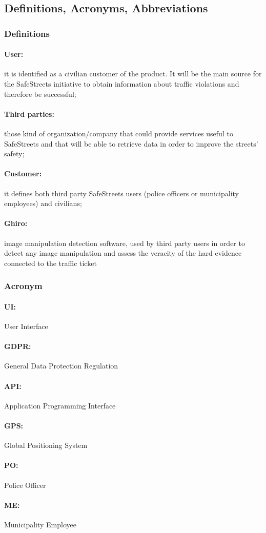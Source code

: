 \documentclass{article}
\begin{document}
\subsection{Definitions, Acronyms, Abbreviations}
\subsubsection{Definitions}
\paragraph{User:} it is identified as a civilian customer of the product. It
will be the main source for the SafeStreets initiative to obtain information
about traffic violations and therefore be successful; \paragraph{Third
parties:}those kind of organization/company that could provide services useful
to SafeStreets and that will be able to retrieve data in order to improve the
streets' safety; \paragraph{Customer:} it defines both third party SafeStreets
users (police officers or municipality employees) and civilians;
\paragraph{Ghiro:} image manipulation detection software, used by third party
users in order to detect any image manipulation and assess the veracity of the
hard evidence connected to the traffic ticket
\subsubsection{Acronym}
\paragraph{UI:} User Interface \paragraph{GDPR:} General Data Protection
Regulation \paragraph{API:} Application Programming Interface \paragraph{GPS:}
Global Positioning System \paragraph{PO:} Police Officer \paragraph{ME:}
Municipality Employee
\end{document}
